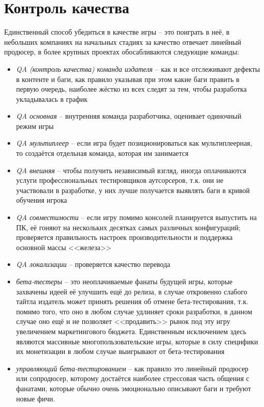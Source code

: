 \section{Контроль качества}

Единственный способ убедиться в качестве игры -- это поиграть в неё, в небольших компаниях на начальных
стадиях за качество отвечает линейный продюсер, в более крупных проектах обосабливаются следующие команды:
\begin{itemize}
    \item \emph{QA (контроль качества) команда издателя} -- как и все отслеживают дефекты в контенте и баги,
        как правило указывая при этом какие баги править в первую очередь, наиболее жёстко из всех следят
        за тем, чтобы разработка укладывалась в график
    \item \emph{QA основная} -- внутренняя команда разработчика, оценивает одиночный режим игры
    \item \emph{QA мультиплеер} -- если игра будет позиционироваться как мультиплеерная, то создаётся
        отдельная команда, которая им занимается
    \item \emph{QA внешняя} -- чтобы получить независимый взгляд, иногда оплачиваются услуги
        профессиональных тестировщиков аутсорсеров, т.к. они не участвовали в разработке, у них лучше
        получается выявлять баги в кривой обучения игрока
    \item \emph{QA совместимости} -- если игру помимо консолей планируется выпустить на ПК, её гоняют на
        нескольких десятках самых различных конфигураций; проверяется правильность настроек
        производительности и поддержка основной массы <<железа>>
    \item \emph{QA локализации} -- проверяется качество перевода
    \item \emph{бета-тестеры} -- это неоплачиваемые фанаты будущей игры, которые захвачены идеей её улучшить
        ещё до релиза, в случае откровенно слабого тайтла издатель может принять решения об отмене
        бета-тестирования, т.к. помимо того, что оно в любом случае удлиняет сроки разработки, в данном
        случае оно ещё и не позволяет <<продавить>> рынок под эту игру увеличением маркетингового бюджета.
        Единственным исключением здесь являются массивные многопользовательские игры, которые в силу
        специфики их монетизации в любом случае выигрывают от бета-тестирования
    \item \emph{управляющий бета-тестированием} -- как правило это линейный продюсер или сопродюсер,
        которому достаётся наиболее стрессовая часть общения с фанатами, которые обычно очень эмоционально
        описывают баги и требуют новые фичи.
\end{itemize}

